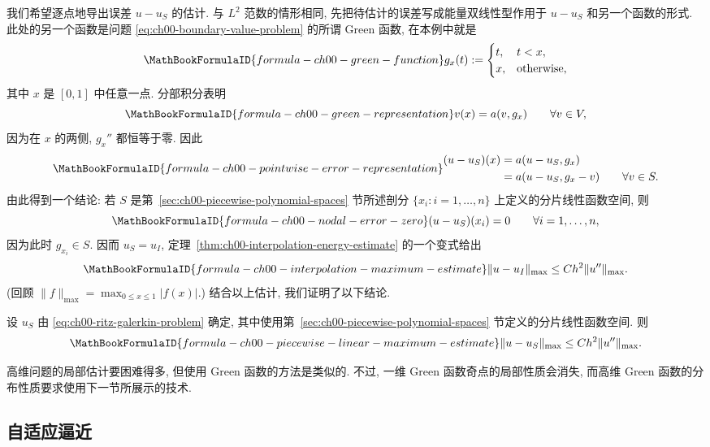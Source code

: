 我们希望逐点地导出误差 $u-u_S$ 的估计. 与 $L^2$ 范数的情形相同, 先把待估计的误差写成能量双线性型作用于 $u-u_S$ 和另一个函数的形式. 此处的另一个函数是问题 \eqref{eq:ch00-boundary-value-problem} 的所谓 Green 函数, 在本例中就是
\[
\MathBookFormulaID{formula-ch00-green-function}
g_x(t):=\begin{cases}t,&t<x,\\x,&\text{otherwise},\end{cases}
\]
其中 $x$ 是 $[0,1]$ 中任意一点. 分部积分表明
\[
\MathBookFormulaID{formula-ch00-green-representation}
v(x)=a(v,g_x)\qquad\forall v\in V,
\]
因为在 $x$ 的两侧, $g_x''$ 都恒等于零. 因此
\[
\MathBookFormulaID{formula-ch00-pointwise-error-representation}
\begin{aligned}
(u-u_S)(x)&=a(u-u_S,g_x)\\
&=a(u-u_S,g_x-v)\qquad\forall v\in S.
\end{aligned}
\]
由此得到一个结论: 若 $S$ 是第~\ref{sec:ch00-piecewise-polynomial-spaces} 节所述剖分 $\{x_i:i=1,\ldots,n\}$ 上定义的分片线性函数空间, 则
\[
\MathBookFormulaID{formula-ch00-nodal-error-zero}
(u-u_S)(x_i)=0\qquad\forall i=1,\ldots,n,
\]
因为此时 $g_{x_i}\in S$. 因而 $u_S=u_I$, 定理~\ref{thm:ch00-interpolation-energy-estimate} 的一个变式给出
\setcounter{equation}{0}
\begin{equation}
\MathBookFormulaID{formula-ch00-interpolation-maximum-estimate}
\|u-u_I\|_{\max}\leq Ch^2\|u''\|_{\max}.
\label{eq:ch00-interpolation-maximum-estimate}
\end{equation}
(回顾 $\|f\|_{\max}=\max_{0\leq x\leq1}|f(x)|$.) 结合以上估计, 我们证明了以下结论.

\setcounter{thmcount}{1}
\begin{Theorem}
\label{thm:ch00-piecewise-linear-maximum-estimate}
设 $u_S$ 由 \eqref{eq:ch00-ritz-galerkin-problem} 确定, 其中使用第~\ref{sec:ch00-piecewise-polynomial-spaces} 节定义的分片线性函数空间. 则
\[
\MathBookFormulaID{formula-ch00-piecewise-linear-maximum-estimate}
\|u-u_S\|_{\max}\leq Ch^2\|u''\|_{\max}.
\]
\end{Theorem}

高维问题的局部估计要困难得多, 但使用 Green 函数的方法是类似的. 不过, 一维 Green 函数奇点的局部性质会消失, 而高维 Green 函数的分布性质要求使用下一节所展示的技术.

\subsection{自适应逼近}
\label{sec:ch00-adaptive-approximation}

